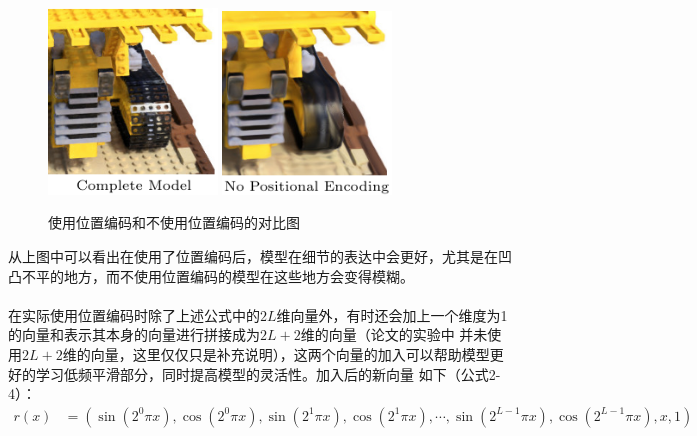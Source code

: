 \documentclass{nwputhesis}
\begin{document}
\begin{figure}[H]
    \centering
    \includegraphics[width=0.4\textwidth]{picture/6.png}
    \includegraphics[width=0.4\textwidth]{picture/7.png}
    \caption{使用位置编码和不使用位置编码的对比图}
\end{figure}
\indent
从上图中可以看出在使用了位置编码后，模型在细节的表达中会更好，尤其是在凹凸不平的地方，而不使用位置编码的模型在这些地方会变得模糊。\\
\\
\indent
在实际使用位置编码时除了上述公式中的$2L$维向量外，有时还会加上一个维度为1的向量和表示其本身的向量进行拼接成为$2L+2$维的向量（论文的实验中
并未使用$2L+2$维的向量，这里仅仅只是补充说明），这两个向量的加入可以帮助模型更好的学习低频平滑部分，同时提高模型的灵活性。加入后的新向量
如下（公式2-4）：
\begin{equation}
    \begin{aligned}
        r(x) &= (\sin(2^0\pi x), \cos(2^0\pi x), \sin(2^1\pi x), \cos(2^1\pi x), \cdots, \sin(2^{L-1}\pi x), \cos(2^{L-1}\pi x), x, 1)
    \end{aligned}
\end{equation}
\end{document}
